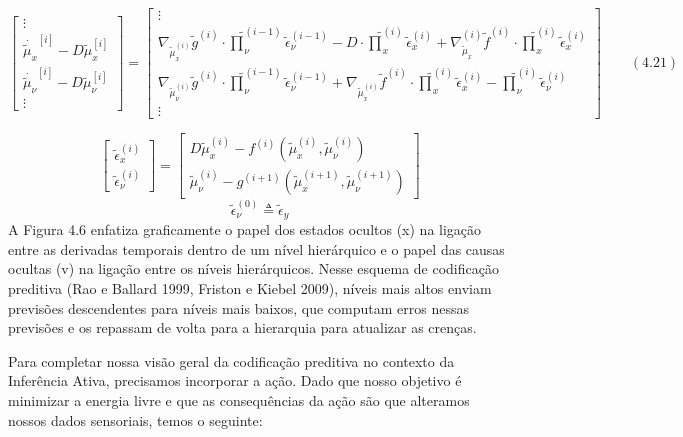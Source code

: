 \documentclass[
  12pt,
]{book}
\begin{document}
\[ \begin{bmatrix} 
\vdots \\ \dot{\tilde\mu_x}^{[i]}- D\tilde\mu_x^{[i]} \\ \dot{\tilde\mu_\nu}^{[i]}- D\tilde\mu_\nu^{[i]} \\ \vdots \end{bmatrix} = \begin{bmatrix} \vdots 
\\ \nabla_{{\tilde \mu}_x^{(i)}}\tilde g^{(i)}\cdot \tilde \prod_\nu^{(i-1)}\tilde\epsilon_\nu^{(i-1)} - D\cdot\tilde\prod_x^{(i)}\tilde\epsilon_x^{(i)} + \nabla_{\tilde\mu_x}^{(i)}\tilde f^{(i)} \cdot \tilde \prod_x^{(i)} \tilde \epsilon_x^{(i)} 
\\ \nabla_{{\tilde \mu}_\nu^{(i)}}\tilde g^{(i)}\cdot \tilde \prod_\nu^{(i-1)}\tilde\epsilon_\nu^{(i-1)} + \nabla_{\tilde\mu_x^{(i)}}\tilde f^{(i)} \cdot \tilde \prod_x^{(i)} \tilde \epsilon_x^{(i)}-\tilde\prod_\nu^{(i)}\tilde\epsilon_\nu^{(i)} 
\\ \vdots \end{bmatrix} \qquad (4.21)\]

\[\begin{bmatrix} \tilde \epsilon_x^{(i)} \\ \tilde \epsilon_\nu^{(i)} \end{bmatrix} = \begin{bmatrix} D\tilde\mu_x^{(i)}-f^{(i)}(\tilde\mu_x^{(i)}, \tilde\mu_\nu^{(i)}) \\ \tilde\mu_\nu^{(i)} - g^{(i+1)}(\tilde\mu_x^{(i+1)}, \tilde\mu_\nu^{(i+1)}) \end{bmatrix} \]
\[ \tilde\epsilon_\nu^{(0)} \triangleq \tilde\epsilon_y \]
A Figura 4.6 enfatiza graficamente o papel dos estados ocultos (x) na ligação entre as derivadas temporais dentro de um nível hierárquico e o papel das causas ocultas (v) na ligação entre os níveis hierárquicos. Nesse esquema de codificação preditiva (Rao e Ballard 1999, Friston e Kiebel 2009), níveis mais altos enviam previsões descendentes para níveis mais baixos, que computam erros nessas previsões e os repassam de volta para a hierarquia para atualizar as crenças.

Para completar nossa visão geral da codificação preditiva no contexto da Inferência Ativa, precisamos incorporar a ação. Dado que nosso objetivo é minimizar a energia livre e que as consequências da ação são que alteramos nossos dados sensoriais, temos o seguinte:
\end{document}
